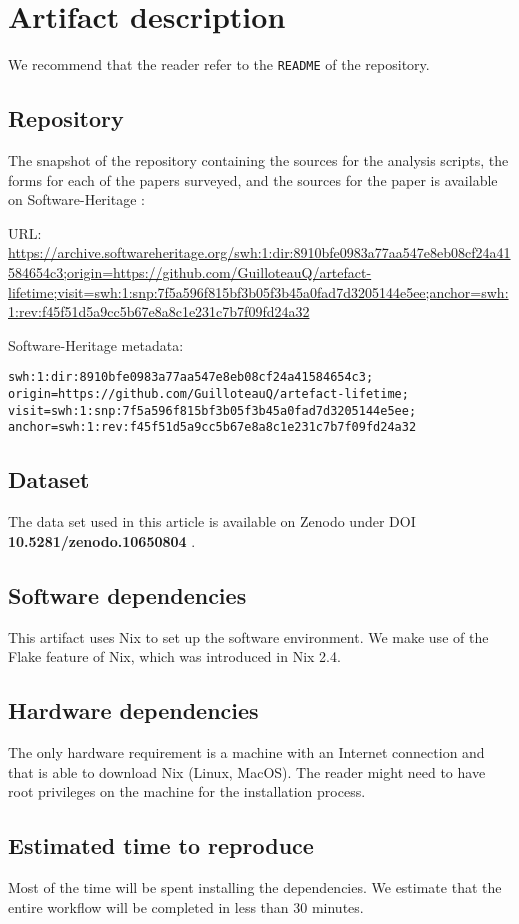 \documentclass[sigconf,natbib=false]{acmart}
\begin{document}
\newpage

\appendix

\section{Artifact description}

We recommend that the reader refer to the \texttt{README} of the repository.

\subsection{Repository}

The snapshot of the repository containing the sources for the analysis scripts, the forms for each of the papers surveyed, and the sources for the paper is available on Software-Heritage \cite{artefact-lifetime}:

URL: \url{https://archive.softwareheritage.org/swh:1:dir:8910bfe0983a77aa547e8eb08cf24a41584654c3;origin=https://github.com/GuilloteauQ/artefact-lifetime;visit=swh:1:snp:7f5a596f815bf3b05f3b45a0fad7d3205144e5ee;anchor=swh:1:rev:f45f51d5a9cc5b67e8a8c1e231c7b7f09fd24a32}

Software-Heritage metadata:

\begin{verbatim}
swh:1:dir:8910bfe0983a77aa547e8eb08cf24a41584654c3;
origin=https://github.com/GuilloteauQ/artefact-lifetime;
visit=swh:1:snp:7f5a596f815bf3b05f3b45a0fad7d3205144e5ee;
anchor=swh:1:rev:f45f51d5a9cc5b67e8a8c1e231c7b7f09fd24a32
\end{verbatim}

\subsection{Dataset}

The data set used in this article is available on Zenodo under DOI \textbf{10.5281/zenodo.10650804} \cite{guilloteau_2024_10650804}.

\subsection{Software dependencies}

This artifact uses Nix to set up the software environment.
We make use of the Flake feature of Nix, which was introduced in Nix 2.4.

\subsection{Hardware dependencies}

The only hardware requirement is a machine with an Internet connection and that is able to download Nix (Linux, MacOS).
The reader might need to have root privileges on the machine for the installation process.

\subsection{Estimated time to reproduce}

Most of the time will be spent installing the dependencies.
We estimate that the entire workflow will be completed in less than 30 minutes.
\end{document}
